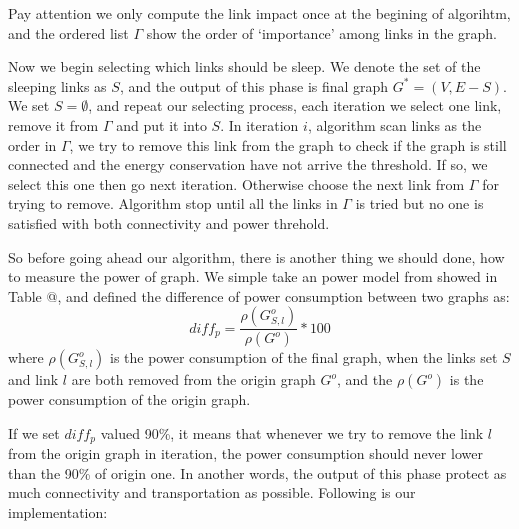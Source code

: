 \documentclass[conference]{IEEEtran}
\makeatletter
\newcommand{\Rmnum}[1]{\expandafter\@slowromancap\romannumeral #1@}
\makeatother
\begin{document}
Pay attention we only compute the link impact once at the begining of algorihtm, and the ordered list $\Gamma$ show 
the order of `importance' among links in the graph. 


Now we begin selecting which links should be sleep.
We denote the set of the sleeping links as $S$, and the output of this phase is final graph $G^* = (V, E-S)$. We set 
$S = \emptyset$, and repeat our selecting process, each iteration we select one link, remove it from $\Gamma$ and put it into $S$. 
In iteration $i$, algorithm scan links as the order in $\Gamma$, we try to
remove this link from the graph to check if the graph is still connected and the energy conservation have not arrive the threshold.
If so, we select this one then go next iteration.
Otherwise choose the next link from $\Gamma$ for trying to remove. Algorithm
stop until all the links in $\Gamma$ is tried but no one is satisfied with both connectivity and power threhold.


So before going ahead our algorithm, there is another thing we should done, how to measure the power of graph.
We simple take an power model from \cite{networking:greente} showed in Table \Rmnum{2}, and defined the difference of power consumption 
between two graphs as:
\begin{equation}
	diff_p = \frac{\rho(G_{S, l}^o)} {\rho(G^o)} * 100
\end{equation}
where $\rho(G_{S, l}^o)$ is the power consumption of the final graph, when the links set $S$ and 
link $l$ are both removed from the origin graph $G^o$, and the $\rho(G^o)$ is the power consumption of 
the origin graph.


If we set $diff_p$ valued 90\%, it means that whenever we try to remove the link $l$ from the origin graph in 
iteration, the power consumption should never lower than the 90\% of origin one. In another words, the output 
of this phase protect as much connectivity and transportation as possible. Following is our implementation: 
\end{document}
